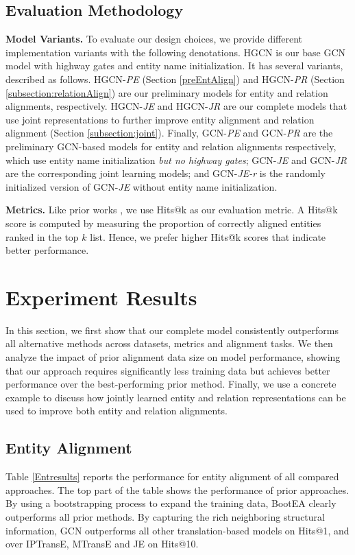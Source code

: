 \documentclass[11pt,a4paper]{article}
\newcommand\cparagraph[1]{\vspace{1mm}\noindent\textbf{#1.}}
\begin{document}
\subsection{Evaluation Methodology}
\cparagraph{Model Variants}
To evaluate our design choices, we provide different implementation variants with the following denotations.
HGCN is our base GCN model with highway gates and entity name initialization. It has several variants, described as follows. HGCN-\emph{PE
}(Section \ref{preEntAlign}) and HGCN-\emph{PR} (Section \ref{subsection:relationAlign}) are our preliminary models for entity and
relation alignments, respectively. HGCN-\emph{JE} and HGCN-\emph{JR} are our complete models that use joint representations to further improve entity alignment and relation alignment (Section \ref{subsection:joint}). Finally, GCN-\emph{PE} and GCN-\emph{PR} are the preliminary GCN-based models for entity and relation alignments respectively, which use
entity name initialization \emph{but no highway gates}; GCN-\emph{JE} and GCN-\emph{JR} are the corresponding joint learning models; and GCN-\emph{JE-r} is the randomly initialized version of GCN-\emph{JE} without entity name initialization.


\cparagraph{Metrics} Like prior works \cite{sun2017cross,D18-1032,ijcai2018-611}, we use Hits@k as our evaluation metric. A Hits@k score is computed by measuring the proportion of correctly aligned entities ranked in the top $k$ list. Hence, we prefer higher Hits@k scores that indicate better performance.  


\section{Experiment Results\label{sec:results}}
In this section, we first show that our complete model consistently outperforms all alternative methods across datasets,
metrics and alignment tasks. We then analyze the impact of prior alignment data size on model performance, showing that our approach
requires significantly less training data but achieves better performance over the best-performing prior method. Finally, we use a concrete
example to discuss how jointly learned entity and relation representations can be used to improve both entity and relation alignments.



\subsection{Entity Alignment\label{sec:result:ea}}
Table \ref{Entresults} reports the performance for entity alignment of all compared approaches. The top part of the table shows the
performance of prior approaches. By using a bootstrapping process to expand the training data, BootEA clearly outperforms all prior
methods. By capturing the rich neighboring structural information, GCN outperforms all other translation-based models on Hits@1, and over IPTransE, MTransE and
JE on Hits@10.
\end{document}
